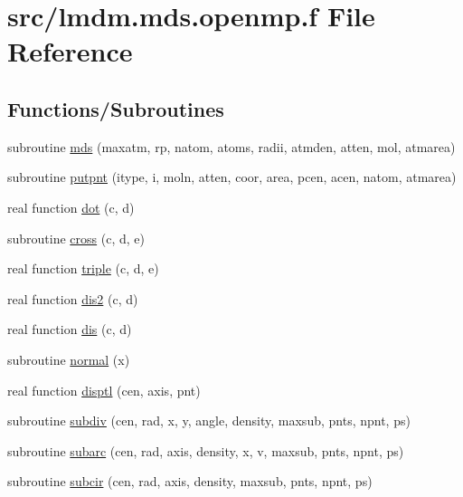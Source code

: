 \hypertarget{lmdm_8mds_8openmp_8f}{}\section{src/lmdm.mds.\+openmp.\+f File Reference}
\label{lmdm_8mds_8openmp_8f}
\subsection*{Functions/\+Subroutines}
\begin{DoxyCompactItemize}
\item 
subroutine \hyperlink{lmdm_8mds_8openmp_8f_aa81f9e2405716814317f319fe16aabf3}{mds} (maxatm, rp, natom, atoms, radii, atmden, atten, mol, atmarea)
\item 
subroutine \hyperlink{lmdm_8mds_8openmp_8f_abe5d23f06aa6cacf4afa05316bab2b62}{putpnt} (itype, i, moln, atten, coor, area, pcen, acen, natom, atmarea)
\item 
real function \hyperlink{lmdm_8mds_8openmp_8f_ae601373f8acae350412756b81d7274c6}{dot} (c, d)
\item 
subroutine \hyperlink{lmdm_8mds_8openmp_8f_ac8fc253e71c54239b8fdeca12294dc5c}{cross} (c, d, e)
\item 
real function \hyperlink{lmdm_8mds_8openmp_8f_a4f0dc28bb4bc5945b250816796a6393c}{triple} (c, d, e)
\item 
real function \hyperlink{lmdm_8mds_8openmp_8f_a0bbe4edf805497daf7eb55647f0e5463}{dis2} (c, d)
\item 
real function \hyperlink{lmdm_8mds_8openmp_8f_a01231839cc4a4124a635ad9d120126a6}{dis} (c, d)
\item 
subroutine \hyperlink{lmdm_8mds_8openmp_8f_a104a2973a06ccc713e06d9f6cb97874e}{normal} (x)
\item 
real function \hyperlink{lmdm_8mds_8openmp_8f_a4e9fa2843ce6a1ff87a65c5b8e014c60}{disptl} (cen, axis, pnt)
\item 
subroutine \hyperlink{lmdm_8mds_8openmp_8f_aede2b2a740b771fe587f556209c97414}{subdiv} (cen, rad, x, y, angle, density, maxsub, pnts,                   npnt, ps)
\item 
subroutine \hyperlink{lmdm_8mds_8openmp_8f_ad6dfe437b099fa551d05e784b5c7afcd}{subarc} (cen, rad, axis, density, x, v, maxsub, pnts,                   npnt, ps)
\item 
subroutine \hyperlink{lmdm_8mds_8openmp_8f_a4957fbd7ab497fae37c246c1ae6d6f86}{subcir} (cen, rad, axis, density, maxsub, pnts, npnt,                   ps)
\end{DoxyCompactItemize}


